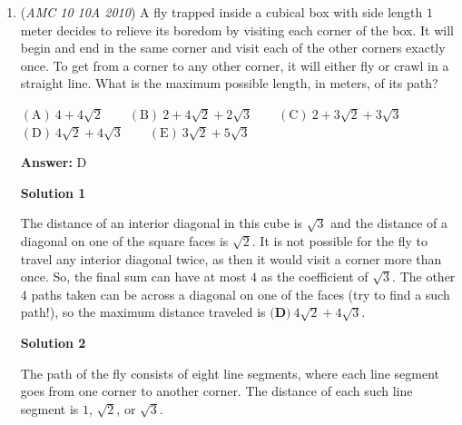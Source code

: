 \begin{enumerate}
 
Next, notice that $\triangle ACE$ is equilateral. And by Pythagorean theorem in $\triangle CQE$, side $CE = \sqrt{r^2 + r + 1}$. Applying area of equilateral triangle formula, area $\triangle ACE = \frac{\sqrt{3}}{4} (r^2 + r + 1)$. Using this area and the area given from 70\% of the area of the hexagon, we get the equation $\frac{7}{10} \cdot \frac{\sqrt{3}}{4} (r^2 + 4r + 1) = \frac{\sqrt{3}}{4} (r^2 + r + 1)$. Simplifying, we get the quadratic $r^2-6r+1=0$, which by Vieta's yields the answer $6, \boxed{\textbf{E}}$.

 \textbf{Proof Triangle ACE is Equilateral.} We know $\triangle{ABC}$, $\triangle{CDE}$, and $\triangle{EFA}$ are congruent by SAS, so the side opposite the 120 degree angle is also the same (since the triangles are congruent). Thus $\triangle{ACE}$ is equilateral.Q.E.D.~mathboy282

 


	\item (\textit{AMC 10 10A 2010}) A fly trapped inside a cubical box with side length $1$ meter decides to relieve its boredom by visiting each corner of the box. It will begin and end in the same corner and visit each of the other corners exactly once. To get from a corner to any other corner, it will either fly or crawl in a straight line. What is the maximum possible length, in meters, of its path?


 $\mathrm{(A)}\ 4+4\sqrt{2} \qquad \mathrm{(B)}\ 2+4\sqrt{2}+2\sqrt{3} \qquad \mathrm{(C)}\ 2+3\sqrt{2}+3\sqrt{3}$
$\mathrm{(D)}\ 4\sqrt{2}+4\sqrt{3} \qquad \mathrm{(E)}\ 3\sqrt{2}+5\sqrt{3}$

 \textbf{Answer: }D



\textbf{Solution 1}

The distance of an interior diagonal in this cube is $\sqrt{3}$ and the distance of a diagonal on one of the square faces is $\sqrt{2}$. It is not possible for the fly to travel any interior diagonal twice, as then it would visit a corner more than once. So, the final sum can have at most  $4$ as the coefficient of $\sqrt{3}$. The other $4$ paths taken can be across a diagonal on one of the faces (try to find a such path!), so the maximum distance traveled is $\textbf{(D)}\ 4\sqrt{2}+4\sqrt{3}$.

 



\textbf{Solution 2}

The path of the fly consists of eight line segments, where each line segment goes from one corner to another corner. The distance of each such line segment is $1$, $\sqrt{2}$, or $\sqrt{3}$.


\end{enumerate}
